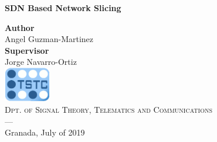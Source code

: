 \begin{titlepage}
 
 
\setlength{\centeroffset}{-0.5\oddsidemargin}
\addtolength{\centeroffset}{0.5\evensidemargin}
\thispagestyle{empty}

\noindent\hspace*{\centeroffset}\begin{minipage}{\textwidth}

\centering

% 

 \vspace{3.3cm}



{\Huge\bfseries SDN Based Network Slicing\\
}
\end{minipage}

\vspace{2.5cm}
\noindent\hspace*{\centeroffset}\begin{minipage}{\textwidth}
\centering

\textbf{Author}\\ {Angel Guzman-Martinez}\\[2.5ex]
\textbf{Supervisor}\\
{Jorge Navarro-Ortiz}\\[2cm]
\includegraphics[width=0.15\textwidth]{imagenes/tstc.png}\\[0.1cm]
\textsc{Dpt. of Signal Theory, Telematics and Communications}\\
\textsc{---}\\
Granada, July of 2019
\end{minipage}

 
\end{titlepage}


